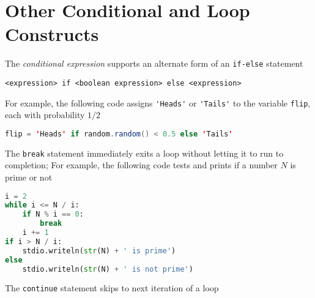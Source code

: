 \documentclass[8pt,a4paper,compress]{beamer}
\begin{document}
\section{Other Conditional and Loop Constructs}
\begin{frame}[fragile]
The \emph{conditional expression} supports an alternate form of an \lstinline$if-else$ statement
 
\begin{lstlisting}[language={}]
<expression> if <boolean expression> else <expression>
\end{lstlisting}

For example, the following code assigns \lstinline{'Heads'} or \lstinline{'Tails'} to the variable \lstinline{flip}, each with probability $1/2$

\begin{lstlisting}[language=Java]
flip = 'Heads' if random.random() < 0.5 else 'Tails'
\end{lstlisting}

\bigskip

The \lstinline{break} statement immediately exits a loop without letting it to run to completion; For example, the following code tests and prints if a number $N$ is prime or not
\begin{lstlisting}[language=Python]
i = 2
while i <= N / i:
    if N % i == 0:
        break
    i += 1
if i > N / i:
    stdio.writeln(str(N) + ' is prime')
else 
    stdio.writeln(str(N) + ' is not prime')
\end{lstlisting}

\bigskip

The \lstinline{continue} statement skips to next iteration of a loop
\end{frame}
\end{document}
